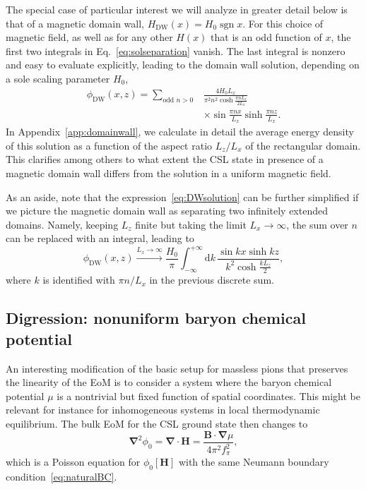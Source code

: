 \documentclass[pdflatex,iicol,sn-mathphys-num]{sn-jnl}
\let\m=\mu
\let\p=\phi
\newcommand{\dd}{\text{d}}%
\newcommand{\vek}[1]{\bm{#1}}%
\newcommand{\grad}{\vek\nabla}%
\newcommand{\divg}{\grad\cdot}%
\begin{document}
The special case of particular interest we will analyze in greater detail below is that of a magnetic domain wall, $H_\text{DW}(x)=H_0\operatorname{sgn}x$. For this choice of magnetic field, as well as for any other $H(x)$ that is an odd function of $x$, the first two integrals in Eq.~\eqref{eq:solseparation} vanish. The last integral is nonzero and easy to evaluate explicitly, leading to the domain wall solution, depending on a sole scaling parameter $H_0$,
\begin{equation}
\begin{split}
\p_{\text{DW}}(x,z)=\sum_{\text{odd }n>0}&\frac{4H_0L_x}{\pi^2n^2\cosh\frac{\pi nL_z}{2L_x}}\\
&\times\sin\frac{\pi nx}{L_x}\sinh\frac{\pi nz}{L_x}.
\end{split}
\label{eq:DWsolution}
\end{equation}
In Appendix~\ref{app:domainwall}, we calculate in detail the average energy density of this solution as a function of the aspect ratio $L_z/L_x$ of the rectangular domain. This clarifies among others to what extent the CSL state in presence of a magnetic domain wall differs from the solution in a uniform magnetic field.

As an aside, note that the expression~\eqref{eq:DWsolution} can be further simplified if we picture the magnetic domain wall as separating two infinitely extended domains. Namely, keeping $L_z$ finite but taking the limit $L_x\to\infty$, the sum over $n$ can be replaced with an integral, leading to
\begin{equation}
\p_{\text{DW}}(x,z)\xrightarrow{L_x\to\infty}\frac{H_0}{\pi}\int_{-\infty}^{+\infty}\dd k\,\frac{\sin kx\sinh kz}{k^2\cosh\frac{kL_z}2},
\end{equation}
where $k$ is identified with $\pi n/L_x$ in the previous discrete sum.


\subsection{Digression: nonuniform baryon chemical potential}
\label{subsec:nonuniformBzeroMdigression}

An interesting modification of the basic setup for massless pions that preserves the linearity of the EoM is to consider a system where the baryon chemical potential $\m$ is a nontrivial but fixed function of spatial coordinates. This might be relevant for instance for inhomogeneous systems in local thermodynamic equilibrium. The bulk EoM for the CSL ground state then changes to
\begin{equation}
\grad^2\p_0=\divg\vek H=\frac{\vek B\cdot\grad\m}{4\pi^2f_\pi^2},
\end{equation}
which is a Poisson equation for $\p_0[\vek H]$ with the same Neumann boundary condition~\eqref{eq:naturalBC}.
\end{document}
